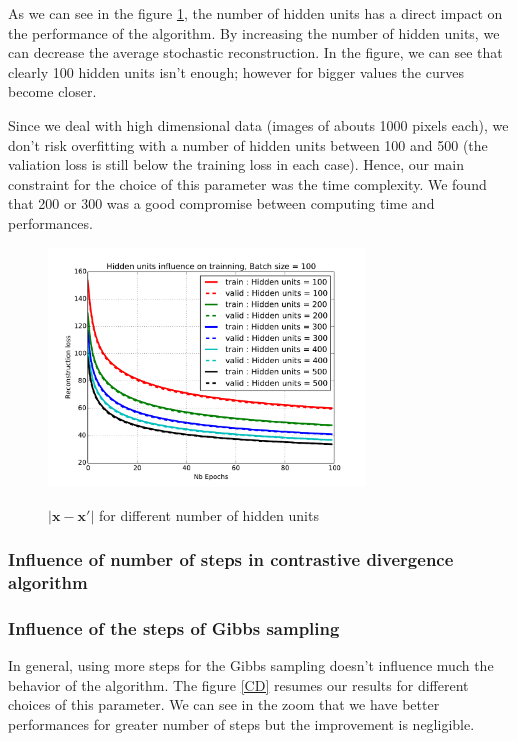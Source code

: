 \documentclass{article}
\begin{document}
As we can see in the figure \ref{hidden}, the number of hidden units has a direct impact on the performance of the algorithm. By increasing the number of hidden units, we can decrease the average stochastic reconstruction. In the figure, we can see that clearly 100 hidden units isn't enough; however for bigger values the curves become closer. 

Since we deal with high dimensional data (images of abouts 1000 pixels each), we don't risk overfitting with a number of hidden units between 100 and 500 (the valiation loss is still below the training loss in each case). Hence, our main constraint for the choice of this parameter was the time complexity. We found that 200 or 300 was a good compromise between computing time and performances.

\begin{figure}
\centering
\includegraphics[width=0.75\textwidth]{hidden_units}
\label{hidden}
\caption{$\lvert \mathbf{x} - \mathbf{x'} \rvert$ for different number of hidden units}
\end{figure}


\subsubsection{Influence of number of steps in contrastive divergence algorithm}
\label{subsubsec:CDk}

\subsubsection{Influence of the steps of Gibbs sampling}

In general, using more steps for the Gibbs sampling doesn't influence much the behavior of the algorithm. The figure \ref{CD} resumes our results for different choices of this parameter. We can see in the zoom that we have better performances for greater number of steps but the improvement is negligible.
\end{document}
